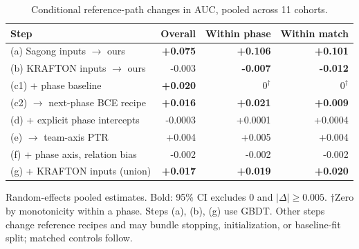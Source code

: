 \begin{table}[t]
\centering\footnotesize
\caption{Conditional reference-path changes in AUC, pooled across 11 cohorts.}
\label{tab:steps}
\setlength{\tabcolsep}{3pt}
\begin{tabular}{lrrr}
\toprule
Step & Overall & Within phase & Within match \\
\midrule
(a) Sagong inputs $\to$ ours & \textbf{+0.075} & \textbf{+0.106} & \textbf{+0.101} \\
(b) KRAFTON inputs $\to$ ours & -0.003 & \textbf{-0.007} & \textbf{-0.012} \\
(c1) + phase baseline & \textbf{+0.020} & $0^{\dagger}$ & $0^{\dagger}$ \\
(c2) $\to$ next-phase BCE recipe & \textbf{+0.016} & \textbf{+0.021} & \textbf{+0.009} \\
(d) + explicit phase intercepts & -0.0003 & +0.0001 & +0.0004 \\
(e) $\to$ team-axis PTR & +0.004 & +0.005 & +0.004 \\
(f) + phase axis, relation bias & -0.002 & -0.002 & -0.002 \\
(g) + KRAFTON inputs (union) & \textbf{+0.017} & \textbf{+0.019} & \textbf{+0.020} \\
\bottomrule
\end{tabular}
\smallskip
\parbox{\columnwidth}{\scriptsize Random-effects pooled estimates. Bold: 95\% CI excludes 0 and $|\Delta|\geq0.005$. $\dagger$Zero by monotonicity within a phase. Steps (a), (b), (g) use GBDT. Other steps change reference recipes and may bundle stopping, initialization, or baseline-fit split; matched controls follow.}
\end{table}

